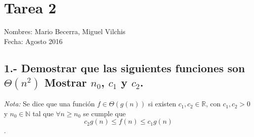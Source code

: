 \documentclass{article}
\begin{document}
\section*{Tarea 2}

Nombres: Mario Becerra, Miguel Vilchis \\
Fecha: Agosto 2016


\subsection*{1.- Demostrar que las siguientes funciones son $\Theta(n^2)$ Mostrar $n_0$, $c_1$ y $c_2$.}
\textit{Nota:} Se dice que una función  $f \in \Theta(g(n))$ si existen $c_1, c_2 \in \mathbb{R}$, con $c_1, c_2 > 0$ y $n_0 \in \mathbb{N}$ tal que $\forall n \geq n_0$ se cumple que
\[ c_2 g(n) \leq f(n) \leq c_1 g(n) \].
\end{document}
